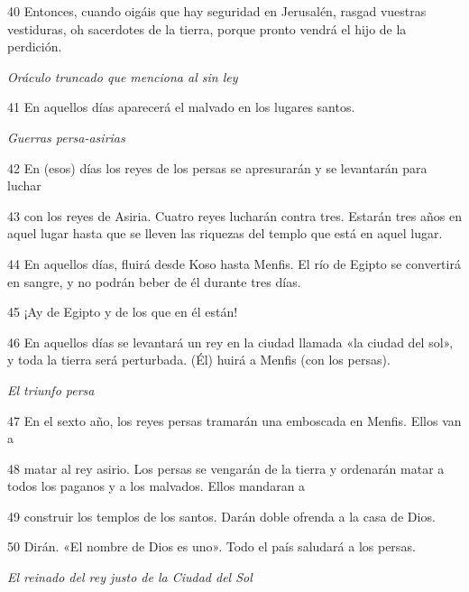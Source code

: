 \par 40 Entonces, cuando oigáis que hay seguridad en Jerusalén, rasgad vuestras vestiduras, oh sacerdotes de la tierra, porque pronto vendrá el hijo de la perdición.

\par \textit{Oráculo truncado que menciona al sin ley}

\par 41 En aquellos días aparecerá el malvado en los lugares santos.

\par \textit{Guerras persa-asirias}

\par 42 En (esos) días los reyes de los persas se apresurarán y se levantarán para luchar

\par 43 con los reyes de Asiria. Cuatro reyes lucharán contra tres. Estarán tres años en aquel lugar hasta que se lleven las riquezas del templo que está en aquel lugar.

\par 44 En aquellos días, fluirá desde Koso hasta Menfis. El río de Egipto se convertirá en sangre, y no podrán beber de él durante tres días.

\par 45 ¡Ay de Egipto y de los que en él están!

\par 46 En aquellos días se levantará un rey en la ciudad llamada «la ciudad del sol», y toda la tierra será perturbada. (Él) huirá a Menfis (con los persas).

\par \textit{El triunfo persa}

\par 47 En el sexto año, los reyes persas tramarán una emboscada en Menfis. Ellos van a

\par 48 matar al rey asirio. Los persas se vengarán de la tierra y ordenarán matar a todos los paganos y a los malvados. Ellos mandaran a

\par 49 construir los templos de los santos. Darán doble ofrenda a la casa de Dios.

\par 50 Dirán. «El nombre de Dios es uno». Todo el país saludará a los persas.

\par \textit{El reinado del rey justo de la Ciudad del Sol}

